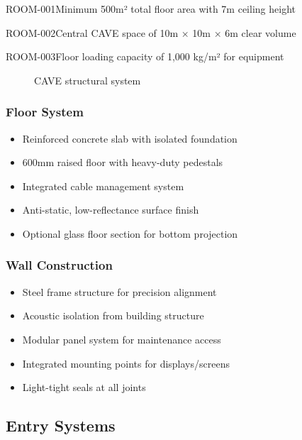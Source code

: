 \begin{requirement}{ROOM-001}{Minimum 500m² total floor area with 7m ceiling height}
\begin{requirement}{ROOM-002}{Central CAVE space of 10m × 10m × 6m clear volume}
\begin{requirement}{ROOM-003}{Floor loading capacity of 1,000 kg/m² for equipment}
\begin{figure}[H]
\caption{CAVE structural system}
\end{figure}

\subsubsection{Floor System}
\begin{itemize}
    \item Reinforced concrete slab with isolated foundation
    \item 600mm raised floor with heavy-duty pedestals
    \item Integrated cable management system
    \item Anti-static, low-reflectance surface finish
    \item Optional glass floor section for bottom projection
\end{itemize}

\subsubsection{Wall Construction}
\begin{itemize}
    \item Steel frame structure for precision alignment
    \item Acoustic isolation from building structure
    \item Modular panel system for maintenance access
    \item Integrated mounting points for displays/screens
    \item Light-tight seals at all joints
\end{itemize}

\subsection{Entry Systems}


\end{requirement}
\end{requirement}
\end{requirement}
